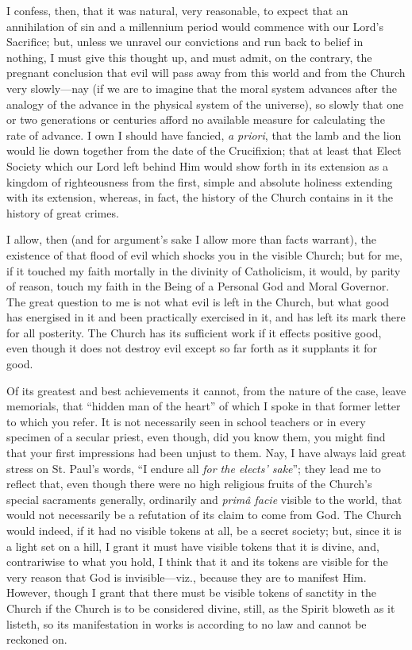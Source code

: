 I confess, then, that it was natural, very
reasonable, to expect that an annihilation of sin and a millennium
period would commence with our Lord's Sacrifice; but, unless we
unravel our convictions and run back to belief in nothing, I must give
this thought up, and must admit, on the contrary, the pregnant
conclusion that evil will pass away from this world and from the
Church very slowly—nay (if we are to imagine that the moral system
advances after the analogy of the advance in the physical system of
the universe), so slowly that one or two generations or centuries
afford no available measure for calculating the rate of advance. I own
I should have fancied, \emph{a priori}, that the lamb and the lion
would lie down together from the date of the Crucifixion; that at
least that Elect Society which our Lord left behind Him would show
forth in its extension as a kingdom of righteousness from the first,
simple and absolute holiness extending with its extension, whereas, in
fact, the history of the Church contains in it the history of great
crimes.

I allow, then (and for argument's sake I allow
more than facts warrant), the existence of that flood of evil which
shocks you in the visible Church; but for me, if it touched my faith
mortally in the divinity of Catholicism, it would, by parity of
reason, touch my faith in the Being of a Personal God and Moral
Governor. The great question to me is not what evil is left in
the Church, but what good has energised in it and been practically
exercised in it, and has left its mark there for all posterity. The
Church has its sufficient work if it effects positive good, even
though it does not destroy evil except so far forth as it supplants it
for good.

Of its greatest and best achievements it cannot,
from the nature of the case, leave memorials, that ``hidden man of the
heart'' of which I spoke in that former letter to which you refer. It
is not necessarily seen in school teachers or in every specimen of a
secular priest, even though, did you know them, you might find that
your first impressions had been unjust to them. Nay, I have always
laid great stress on St. Paul's words, ``I endure all \emph{for the elects'
sake}''; they lead me to reflect that, even though there were no
high religious fruits of the Church's special sacraments generally,
ordinarily and \emph{primâ facie} visible to the world, that would
not necessarily be a refutation of its claim to come from God. The
Church would indeed, if it had no visible tokens at all, be a secret
society; but, since it is a light set on a hill, I grant it must have
visible tokens that it is divine, and, contrariwise to what you hold,
I think that it and its tokens are visible for the very reason that
God is invisible—viz., because they are to manifest Him. However,
though I grant that there must be visible tokens of sanctity in the
Church if the Church is to be considered divine, still, as the Spirit
bloweth as it listeth, so its manifestation in works is according to
no law and cannot be reckoned on.

